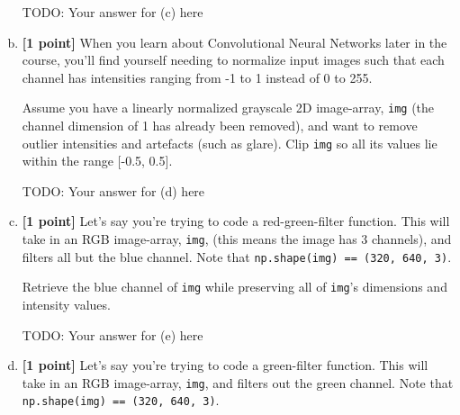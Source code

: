 \begin{enumerate}[(a)]
\begin{tcolorbox}[colback=white!5!white,colframe=green!75!black]
    \begin{mdframed}
        TODO: Your answer for (c) here
    \end{mdframed}
\end{tcolorbox}
    
    \item \textbf{[1 point]} When you learn about Convolutional Neural Networks later in the course, you'll find yourself needing to normalize input images such that each channel has intensities ranging from -1 to 1 instead of 0 to 255.
    
    \begin{tcolorbox}[colback=orange!5!white,colframe=orange!75!black]
    Assume you have a linearly normalized grayscale 2D image-array, \texttt{img} (the channel dimension of 1 has already been removed), and want to remove outlier intensities and artefacts (such as glare). Clip \texttt{img} so all its values lie within the range [-0.5, 0.5].
    \end{tcolorbox}

\begin{tcolorbox}[colback=white!5!white,colframe=green!75!black]
    \begin{mdframed}
        TODO: Your answer for (d) here
    \end{mdframed}
\end{tcolorbox}
    
    \item \textbf{[1 point]} Let's say you're trying to code a red-green-filter function. This will take in an RGB image-array, \texttt{img}, (this means the image has 3 channels), and filters all but the blue channel. Note that \texttt{np.shape(img) == (320, 640, 3)}.
    
    \begin{tcolorbox}[colback=orange!5!white,colframe=orange!75!black]
    Retrieve the blue channel of \texttt{img} while preserving all of \texttt{img}'s dimensions and intensity values.
    \end{tcolorbox}
    
    \begin{tcolorbox}[colback=white!5!white,colframe=green!75!black]
    \begin{mdframed}
        TODO: Your answer for (e) here
    \end{mdframed}
\end{tcolorbox}
    
    \item \textbf{[1 point]} Let's say you're trying to code a green-filter function. This will take in an RGB image-array, \texttt{img}, and filters out the green channel. Note that \texttt{np.shape(img) == (320, 640, 3)}. 
    

\end{enumerate}
